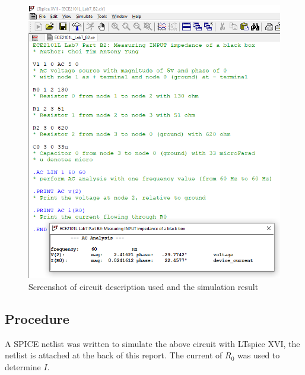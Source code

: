 \documentclass{article}
\begin{document}
\begin{figure}[h]
    \centering
        \includegraphics[scale=0.5]{sim_B2.png}
        \caption{Screenshot of circuit description used and the simulation result}
\end{figure}
\subsection*{Procedure}
A SPICE netlist was written to simulate the above circuit with LTspice XVI, the netlist is attached at the back of this report. The current of $R_0$ was used to determine $I$.
\end{document}
